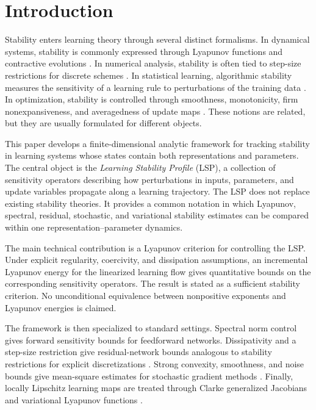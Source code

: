 \documentclass{article}
\numberwithin{equation}{section}
\begin{document}
\section{Introduction}
\label{sec:introduction}

Stability enters learning theory through several distinct formalisms. In
dynamical systems, stability is commonly expressed through Lyapunov functions
and contractive evolutions \cite{HirschSmaleDevaney2012,Khalil2002Nonlinear}.
In numerical analysis, stability is often tied to step-size restrictions for
discrete schemes \cite{Strikwerda2004}. In statistical learning, algorithmic
stability measures the sensitivity of a learning rule to perturbations of the
training data \cite{Bousquet2002,Hardt2016Train}. In optimization, stability is
controlled through smoothness, monotonicity, firm nonexpansiveness, and
averagedness of update maps \cite{Nesterov2004,BauschkeCombettes2011,BottouCurtisNocedal2018}.
These notions are related, but they are usually formulated for different
objects.

This paper develops a finite-dimensional analytic framework for tracking
stability in learning systems whose states contain both representations and
parameters. The central object is the \emph{Learning Stability Profile} (LSP), a
collection of sensitivity operators describing how perturbations in inputs,
parameters, and update variables propagate along a learning trajectory. The LSP
does not replace existing stability theories. It provides a common notation in
which Lyapunov, spectral, residual, stochastic, and variational stability
estimates can be compared within one representation--parameter dynamics.

The main technical contribution is a Lyapunov criterion for controlling the
LSP. Under explicit regularity, coercivity, and dissipation assumptions, an
incremental Lyapunov energy for the linearized learning flow gives quantitative
bounds on the corresponding sensitivity operators. The result is stated as a
sufficient stability criterion. No unconditional equivalence between
nonpositive exponents and Lyapunov energies is claimed.

The framework is then specialized to standard settings. Spectral norm control
gives forward sensitivity bounds for feedforward networks. Dissipativity and a
step-size restriction give residual-network bounds analogous to stability
restrictions for explicit discretizations \cite{Strikwerda2004,HaberRuthotto2017}.
Strong convexity, smoothness, and noise bounds give mean-square estimates for
stochastic gradient methods \cite{KushnerYin2003,Benaim1999,BottouCurtisNocedal2018}.
Finally, locally Lipschitz learning maps are treated through Clarke generalized
Jacobians and variational Lyapunov functions \cite{Clarke1990Optimization,Clarke1998Nonsmooth,RockafellarWets1998}.
\end{document}
